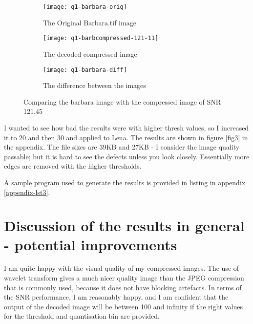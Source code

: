 \documentclass[a4paper]{article}
\begin{document}
\begin{figure}
     
         \centering
         \begin{subfigure}[b]{0.2\textwidth}
                 \centering
                 \texttt{[image: q1-barbara-orig]}
                 \caption{The Original Barbara.tif image}
                 \label{fig1barb:orig}
         \end{subfigure}
         \begin{subfigure}[b]{0.2\textwidth}
                 \centering
                 \texttt{[image: q1-barbcompressed-121-11]}
                 \caption{The decoded compressed image}
                 \label{fig1barb:compressed}
        \end{subfigure}     
	\begin{subfigure}[b]{0.2\textwidth}
                 \centering
                 \texttt{[image: q1-barbara-diff]}
                 \caption{The difference between the images}
                 \label{fig1barb:diff}
        \end{subfigure}     

        \caption{Comparing the barbara image with the compressed image of SNR 121.45}        
        \label{fig2}
 \end{figure}

I wanted to see how bad the results were with higher thresh values, so I increased it to 20 and then 30 and applied to Lena. The results are shown in figure \ref{fig3} in the appendix. The file sizes are 39KB and 27KB - I consider the image quality passable; but it is hard to see the defects unless you look closely. Essentially more edges are removed with the higher thresholds.

A sample program used to generate the results is provided in listing in appendix \ref{appendix-lst3}.
\section{Discussion of the results in general - potential improvements}
I am quite happy with the visual quality of my compressed images. The use of wavelet transform gives a much nicer quality image than the JPEG compression that is commonly used, because it does not have blocking artefacts. In terms of the SNR performance, I am reasonably happy, and I am confident that the output of the decoded image will be between 100 and infinity if the right values for the threshold and quantisation bin are provided.
\end{document}
